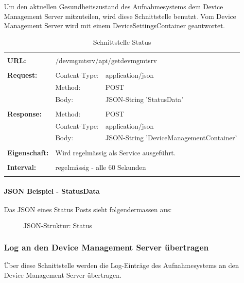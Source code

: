 Um den aktuellen Gesundheitszustand des Aufnahmesystems dem Device Management Server mitzuteilen, wird diese Schnittstelle benutzt. Vom Device Management Server wird mit einem DeviceSettingsContainer geantwortet.

{\renewcommand{\arraystretch}{1}
\begin{longtable}{ p{2.5cm} || p{3.5cm} p{5.5cm}}
&  \\ [-1.5ex] 
	\textbf{URL:} & \multicolumn{2}{l}{/devmgmtsrv/api/getdevmgmtsrv}  \\ [1ex] \hline & &  \\ [-1.5ex]
	\textbf{Request:} & Content-Type: & application/json \\
		& Method: & POST \\
		& Body: & JSON-String 'StatusData'  \\ [1ex] \hline & &  \\ [-1.5ex]
	\textbf{Response:} & Method: & POST \\
		& Content-Type: & application/json \\
		& Body: & JSON-String 'DeviceManagementContainer'  \\ [1ex] \hline & &  \\ [-1.5ex]
	\textbf{Eigenschaft:} & \multicolumn{2}{p{9cm}}{Wird regelmässig als Service ausgeführt.}  \\ [1ex] \hline & &  \\ [-1.5ex]
	\textbf{Interval:} & \multicolumn{2}{p{9cm}}{regelmässig - alle 60 Sekunden}  \\ [1ex] 
	
\caption{Schnittstelle Status}
\end{longtable}	}
\paragraph{JSON Beispiel - StatusData}

Das JSON eines Status Posts sieht folgendermassen aus:

\begin{figure}[H]
	\centering
	
	\caption{JSON-Struktur: Status}
\end{figure}


\newpage
\subsubsection{Log an den Device Management Server übertragen}

Über diese Schnittstelle werden die Log-Einträge des Aufnahmesystems an den Device Management Server übertragen.


